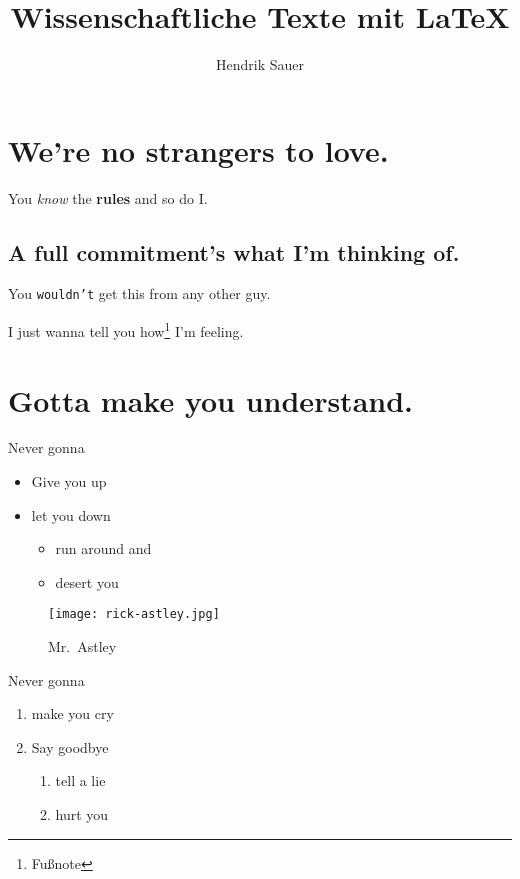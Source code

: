 \documentclass[a4]{article}
\title{Wissenschaftliche Texte mit \LaTeX}
\author{Hendrik Sauer}
\begin{document}
\maketitle
\tableofcontents

\section{We're no strangers to love.}\label{sec:first-verse}

You \emph{know} the \textbf{rules} and so do I.

\subsection{A full commitment's what I'm thinking of.}

You \texttt{wouldn't} get this from any other guy.

I just {\color{green} wanna} tell you how\footnote{Fußnote} I'm {\LARGE \color{green} feeling}.

\section*{Gotta make you understand.}

Never gonna
\begin{itemize}
    \item Give you up
    \item let you down
    \begin{itemize}
        \item run around and
        \item desert you
    \end{itemize}
\end{itemize}

\begin{figure}[H]
    \centering
    \texttt{[image: rick-astley.jpg]}
    \caption{Mr.\ Astley}
    \label{fig:enter-label}
\end{figure}

Never gonna
\begin{enumerate}
    \item make you cry
    \item Say goodbye
    \begin{enumerate}
        \item tell a lie
        \item hurt you
    \end{enumerate}
\end{enumerate}
\end{document}
